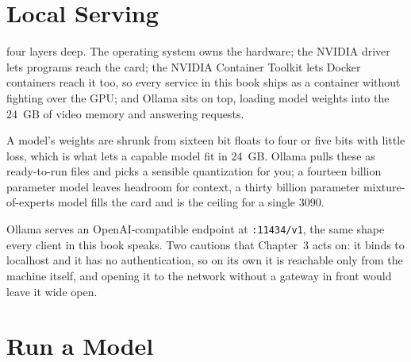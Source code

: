 \section{Local Serving}

 four layers deep. The operating system
owns the hardware; the NVIDIA driver lets programs reach the card; the NVIDIA
Container Toolkit lets Docker containers reach it too, so every service in this
book ships as a container without fighting over the GPU; and Ollama sits on top,
loading model weights into the 24~GB of video memory and answering requests.


 A model's weights are shrunk from sixteen bit
floats to four or five bits with little loss, which is what lets a capable model
fit in 24~GB. Ollama pulls these as ready-to-run files and picks a sensible
quantization for you; a fourteen billion parameter model leaves headroom for
context, a thirty billion parameter mixture-of-experts model fills the card and is
the ceiling for a single 3090.


 Ollama serves an OpenAI-compatible endpoint at
\texttt{:11434/v1}, the same shape every client in this book speaks. Two cautions
that Chapter~3 acts on: it binds to localhost and it has no authentication, so on
its own it is reachable only from the machine itself, and opening it to the
network without a gateway in front would leave it wide open\cite{ollamaDocs}.

\section{Run a Model}

